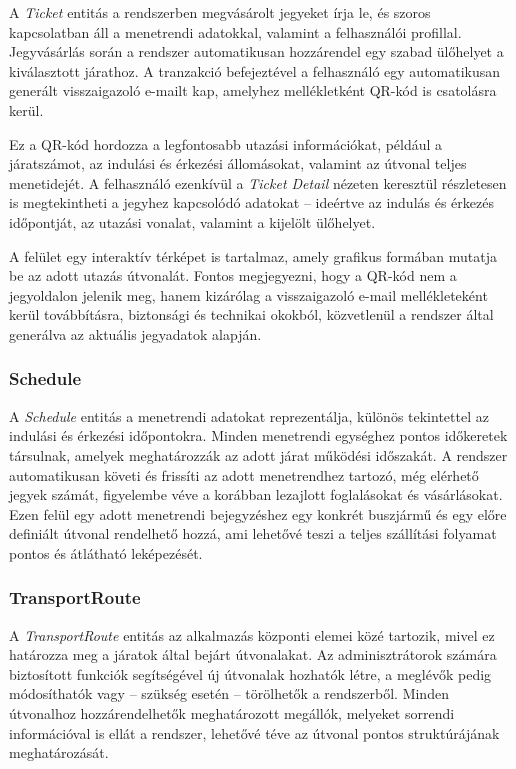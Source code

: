 A \textit{Ticket} entitás a rendszerben megvásárolt jegyeket írja le, és szoros kapcsolatban áll a menetrendi adatokkal, valamint a felhasználói profillal. Jegyvásárlás során a rendszer automatikusan hozzárendel egy szabad ülőhelyet a kiválasztott járathoz. A tranzakció befejeztével a felhasználó egy automatikusan generált visszaigazoló e-mailt kap, amelyhez mellékletként QR-kód is csatolásra kerül.

Ez a QR-kód hordozza a legfontosabb utazási információkat, például a járatszámot, az indulási és érkezési állomásokat, valamint az útvonal teljes menetidejét. A felhasználó ezenkívül a \textit{Ticket Detail} nézeten keresztül részletesen is megtekintheti a jegyhez kapcsolódó adatokat – ideértve az indulás és érkezés időpontját, az utazási vonalat, valamint a kijelölt ülőhelyet.

A felület egy interaktív térképet is tartalmaz, amely grafikus formában mutatja be az adott utazás útvonalát. Fontos megjegyezni, hogy a QR-kód nem a jegyoldalon jelenik meg, hanem kizárólag a visszaigazoló e-mail mellékleteként kerül továbbításra, biztonsági és technikai okokból, közvetlenül a rendszer által generálva az aktuális jegyadatok alapján.

\subsubsection{Schedule}

A \textit{Schedule} entitás a menetrendi adatokat reprezentálja, különös tekintettel az indulási és érkezési időpontokra. Minden menetrendi egységhez pontos időkeretek társulnak, amelyek meghatározzák az adott járat működési időszakát. A rendszer automatikusan követi és frissíti az adott menetrendhez tartozó, még elérhető jegyek számát, figyelembe véve a korábban lezajlott foglalásokat és vásárlásokat. Ezen felül egy adott menetrendi bejegyzéshez egy konkrét buszjármű és egy előre definiált útvonal rendelhető hozzá, ami lehetővé teszi a teljes szállítási folyamat pontos és átlátható leképezését.

\subsubsection{TransportRoute}

A \textit{TransportRoute} entitás az alkalmazás központi elemei közé tartozik, mivel ez határozza meg a járatok által bejárt útvonalakat. Az adminisztrátorok számára biztosított funkciók segítségével új útvonalak hozhatók létre, a meglévők pedig módosíthatók vagy – szükség esetén – törölhetők a rendszerből. Minden útvonalhoz hozzárendelhetők meghatározott megállók, melyeket sorrendi információval is ellát a rendszer, lehetővé téve az útvonal pontos struktúrájának meghatározását.

